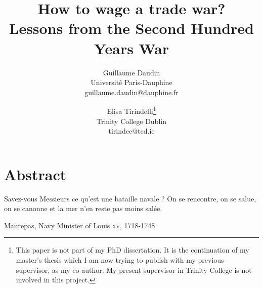 \documentclass[12pt,a4paper,notitlepage]{article}
\begin{document}
\title{How to wage a trade war? \\
Lessons from the Second Hundred Years War}
\author{
  Guillaume Daudin \\ Université Paris-Dauphine \\guillaume.daudin@dauphine.fr		
  \and
  Elisa Tirindelli\footnote{This paper is not part of my PhD dissertation. It is the continuation of my master's thesis which I am now trying to publish with my previous supervisor, as my co-author. My present supervisor in Trinity College is not involved in this project.} \\ Trinity College Dublin  \\ tirindee@tcd.ie
}
\maketitle

\section*{Abstract}

\epigraph{Savez-vous Messieurs ce qu’est une bataille navale ? On se rencontre, on se salue, on se canonne et la mer n’en reste pas moins salée.}{Maurepas, Navy Minister of Louis  \textsc{xv}, 1718-1748}
\end{document}
